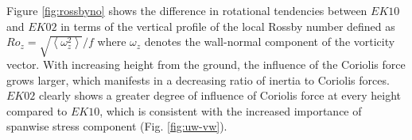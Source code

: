 Figure \ref{fig:rossbyno} shows the difference in rotational tendencies between $EK10$ and $EK02$ in terms of the vertical profile of the local Rossby number defined as $Ro_{z} = \sqrt{\left <  \omega_{z}^2\right >}/f$ where $\omega_z$ denotes the wall-normal component of the vorticity vector. With increasing height from the ground, the influence of the Coriolis force grows larger, which manifests in a decreasing ratio of inertia to Coriolis forces. $EK02$ clearly shows a greater degree of influence of Coriolis force at every height compared to $EK10$, which is consistent with the increased importance of spanwise stress component (Fig. \ref{fig:uw-vw}). 



